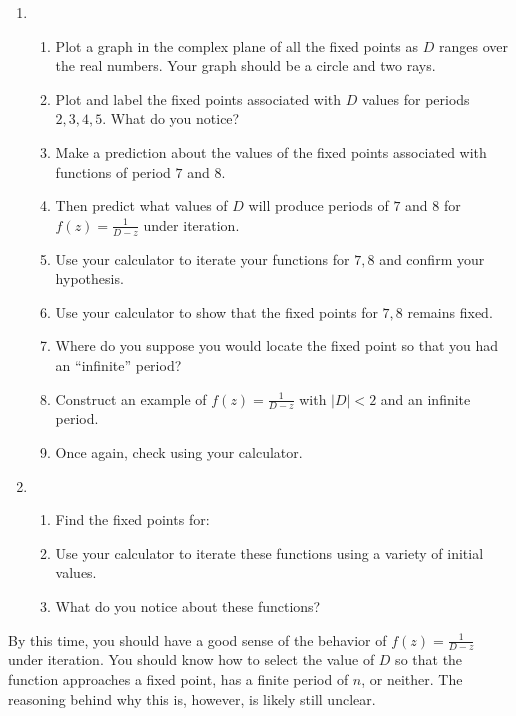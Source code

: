 \documentclass[../gatm.tex]{subfiles}
\begin{document}
\begin{enumerate}
\setcounter{enumi}{\value{problem_i}}
\item \begin{enumerate}
\item Plot a graph in the complex plane of all the fixed points as $D$ ranges over the real numbers. Your graph should be a circle and two rays.
\item Plot and label the fixed points associated with $D$ values for periods $2,3,4,5$. What do you notice?
\item Make a prediction about the values of the fixed points associated with functions of period $7$ and $8$.
\item Then predict what values of $D$ will produce periods of $7$ and $8$ for $f(z)=\frac{1}{D-z}$ under iteration.
\item Use your calculator to iterate your functions for $7,8$ and confirm your hypothesis.
\item Use your calculator to show that the fixed points for $7,8$ remains fixed.
\item Where do you suppose you would locate the fixed point so that you had an ``infinite'' period?
\item Construct an example of $f(z)=\frac{1}{D-z}$ with $|D|<2$ and an infinite period.
\item Once again, check using your calculator.
\end{enumerate}
\item \begin{enumerate}
\item Find the fixed points for:
\begin{enumerate}
\end{enumerate}
\item Use your calculator to iterate these functions using a variety of initial values.
\item What do you notice about these functions?
\end{enumerate}
\setcounter{problem_i}{\value{enumi}}
\end{enumerate}

\noindent By this time, you should have a good sense of the behavior of $f(z)=\frac{1}{D-z}$ under iteration. You should know how to select the value of $D$ so that the function approaches a fixed point, has a finite period of $n$, or neither. The reasoning behind why this is, however, is likely still unclear.
\end{document}
